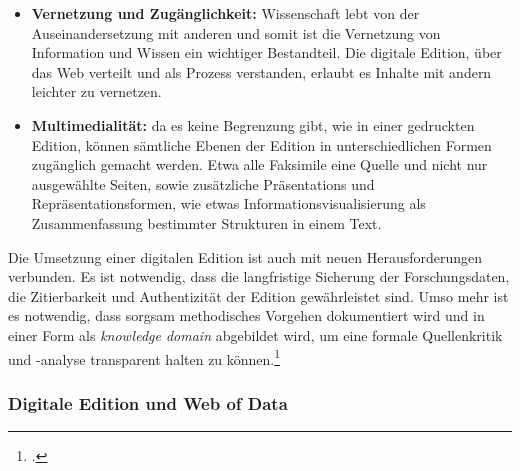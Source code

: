 \documentclass[12pt,a4paper]{article}
\begin{document}
{\begin{itemize}
\item \textbf{Vernetzung und Zugänglichkeit:} Wissenschaft lebt von der Auseinandersetzung mit anderen und somit ist die Vernetzung von Information und Wissen ein wichtiger Bestandteil. Die digitale Edition, über das Web verteilt und als Prozess verstanden, erlaubt es Inhalte mit andern leichter zu vernetzen.  
\item 
\textbf{Multimedialität:} da es keine Begrenzung gibt, wie in einer gedruckten Edition, können sämtliche Ebenen der Edition in unterschiedlichen Formen zugänglich gemacht werden. Etwa alle Faksimile eine Quelle und nicht nur ausgewählte Seiten, sowie zusätzliche Präsentations und Repräsentationsformen, wie etwas Informationsvisualisierung als Zusammenfassung bestimmter Strukturen in einem Text. 
\end{itemize}
Die Umsetzung einer digitalen Edition ist auch mit neuen Herausforderungen verbunden. Es ist notwendig, dass die langfristige Sicherung der Forschungsdaten, die Zitierbarkeit und Authentizität der Edition gewährleistet sind. Umso mehr ist es notwendig, dass sorgsam methodisches Vorgehen dokumentiert wird und in einer Form als \textit{knowledge domain} abgebildet wird, um eine formale Quellenkritik und -analyse transparent halten zu können.\footcite[][S.306-315]{kropavc2004theorien}
}

\subsubsection{Digitale Edition und Web of Data}
\end{document}
